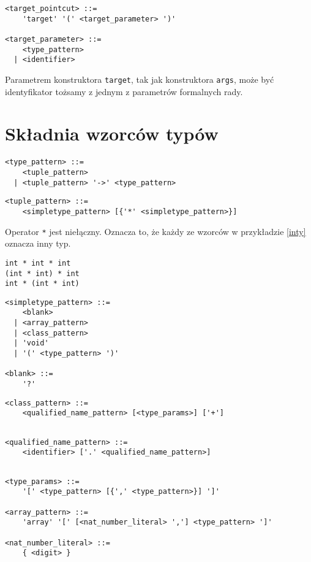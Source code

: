 \documentclass[a4paper,12pt]{mwbk}
\begin{document}
\begin{lstlisting}[style=grammar]
<target_pointcut> ::=
    'target' '(' <target_parameter> ')'

<target_parameter> ::=
    <type_pattern>
  | <identifier>
\end{lstlisting}

Parametrem konstruktora \lstinline!target!, tak jak konstruktora
\lstinline!args!, może być identyfikator tożsamy z jednym z parametrów
formalnych rady.

\section{Składnia wzorców typów}

\begin{lstlisting}[style=grammar]
<type_pattern> ::=
    <tuple_pattern>
  | <tuple_pattern> '->' <type_pattern>
\end{lstlisting}


\begin{lstlisting}[style=grammar]
<tuple_pattern> ::=
    <simpletype_pattern> [{'*' <simpletype_pattern>}]
\end{lstlisting}

Operator \lstinline!*! jest niełączny. Oznacza to, że każdy ze wzorców w
przykładzie \ref{inty} oznacza inny typ.

\begin{lstlisting}[style=AspectJ,label=inty,caption=Operator * jest niełączny]
int * int * int
(int * int) * int
int * (int * int)
\end{lstlisting}


\begin{lstlisting}[style=grammar]
<simpletype_pattern> ::=
    <blank>
  | <array_pattern>
  | <class_pattern>
  | 'void'
  | '(' <type_pattern> ')'

<blank> ::=
    '?'
\end{lstlisting}

\begin{lstlisting}[style=grammar]
<class_pattern> ::=
    <qualified_name_pattern> [<type_params>] ['+']
\end{lstlisting}


\begin{lstlisting}[style=grammar]

<qualified_name_pattern> ::=
    <identifier> ['.' <qualified_name_pattern>]
\end{lstlisting}


\begin{lstlisting}[style=grammar]

<type_params> ::=
    '[' <type_pattern> [{',' <type_pattern>}] ']'
    
<array_pattern> ::=
    'array' '[' [<nat_number_literal> ','] <type_pattern> ']'

<nat_number_literal> ::=
    { <digit> }


\end{lstlisting}
\end{document}
